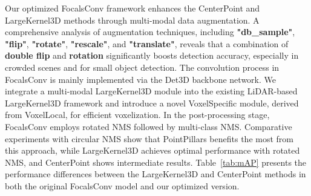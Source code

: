 Our optimized FocalsConv framework enhances the CenterPoint and LargeKernel3D methods through multi-modal data augmentation. A comprehensive analysis of augmentation techniques, including \textbf{"db\_sample"}, \textbf{"flip"}, \textbf{"rotate"}, \textbf{"rescale"}, and \textbf{"translate"}, reveals that a combination of \textbf{double flip} and \textbf{rotation} significantly boosts detection accuracy, especially in crowded scenes and for small object detection. The convolution process in FocalsConv is mainly implemented via the Det3D backbone network. We integrate a multi-modal LargeKernel3D module into the existing LiDAR-based LargeKernel3D framework and introduce a novel VoxelSpecific module, derived from VoxelLocal, for efficient voxelization. In the post-processing stage, FocalsConv employs rotated NMS followed by multi-class NMS. Comparative experiments with circular NMS show that PointPillars benefits the most from this approach, while LargeKernel3D achieves optimal performance with rotated NMS, and CenterPoint shows intermediate results. Table~\ref{tab:mAP} presents the performance differences between the LargeKernel3D and CenterPoint methods in both the original FocalsConv model and our optimized version.


